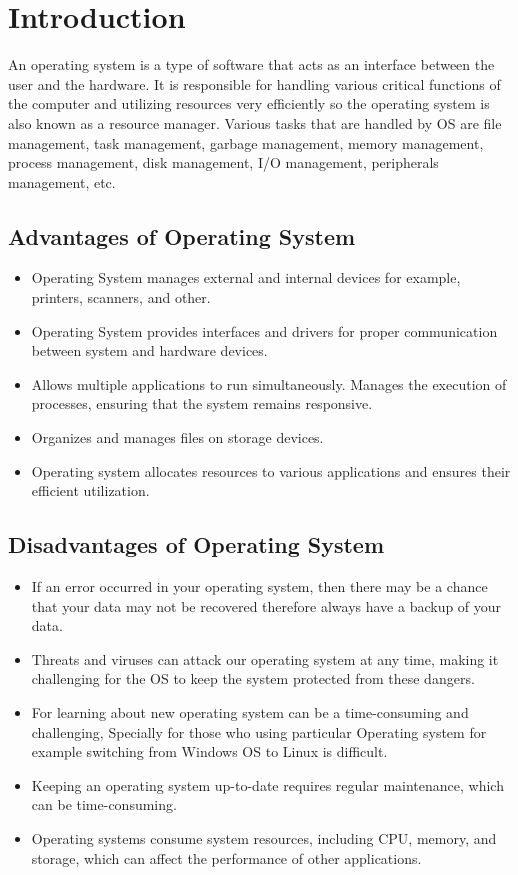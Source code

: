 \section{Introduction}

An operating system is a type of software that acts as an interface between the user and the hardware. It is responsible for handling various critical functions of the computer and utilizing resources very efficiently so the operating system is also known as a resource manager. Various tasks that are handled by OS are file management, task management, garbage management, memory management, process management, disk management, I/O management, peripherals management, etc. \cite{geeksforgeeksHistoryOperating}

\subsection{Advantages of Operating System}

\begin{itemize}
    \item Operating System manages external and internal devices for example, printers, scanners, and other.
    \item Operating System provides interfaces and drivers for proper communication between system and hardware devices.
    \item Allows multiple applications to run simultaneously.
    Manages the execution of processes, ensuring that the system remains responsive.
    \item Organizes and manages files on storage devices.
    \item Operating system allocates resources to various applications and ensures their efficient utilization.

\end{itemize}

\subsection{Disadvantages of Operating System}

\begin{itemize}
    \item If an error occurred in your operating system, then there may be a chance that your data may not be recovered therefore always have a backup of your data.
    \item Threats and viruses can attack our operating system at any time, making it challenging for the OS to keep the system protected from these dangers.
    \item For learning about new operating system can be a time-consuming and challenging, Specially for those who using particular Operating system for example switching from Windows OS to Linux is difficult.
    \item Keeping an operating system up-to-date requires regular maintenance, which can be time-consuming.
    \item Operating systems consume system resources, including CPU, memory, and storage, which can affect the performance of other applications.
\end{itemize}

